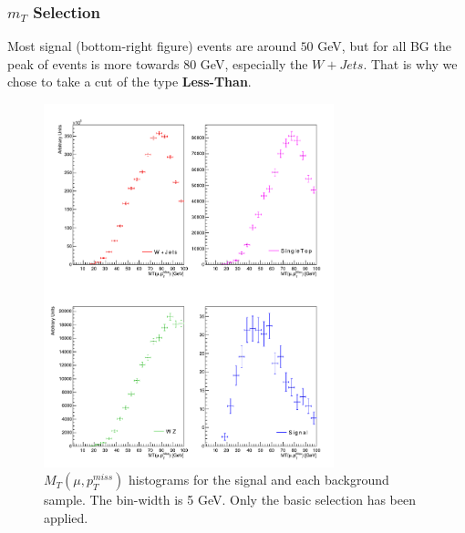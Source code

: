 \documentclass{beamer}
\begin{document}
\begin{frame}
\frametitle{$m_T$ Selection}

\begin{justify}
{\tiny Most signal (bottom-right figure) events are around $50$ GeV, but for all BG the peak of events is more towards $80$ GeV, especially the $W+Jets$. That is why we chose to take a cut of the type \textbf{Less-Than}.}
\end{justify}

\begin{figure}[!h]
\centering
\includegraphics[width=0.75\textwidth, height=0.63\textheight]{pictures/Selection/m_T/All-m_T}
\caption{{\scriptsize $M_T(\mu,p^{miss}_T)$ histograms for the signal and each background sample. The bin-width is 5 GeV. Only the basic selection has been applied.}}
\label{All-m_T}

\end{figure}

\end{frame}

\end{document}
